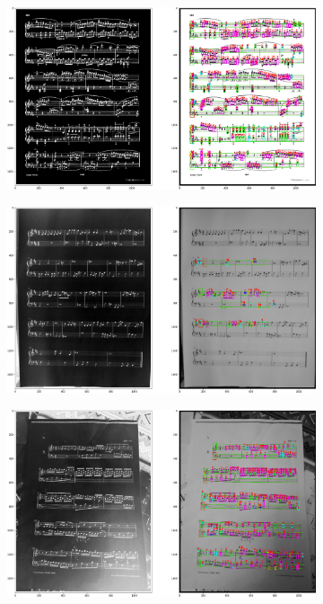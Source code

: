 \documentclass[12pt]{article}
\begin{document}
\begin{enumerate}
\begin{figure}[h!]
\begin{subfigure}[b]{0.48\linewidth}
				\end{subfigure}
				\begin{subfigure}[b]{0.48\linewidth}
					\includegraphics[width=\linewidth]{Medium/Zdj16.png}
				\end{subfigure}
				\begin{subfigure}[b]{0.48\linewidth}
					\includegraphics[width=\linewidth]{Medium/Zdj17.png}
				\end{subfigure}
				\begin{subfigure}[b]{0.48\linewidth}
					\includegraphics[width=\linewidth]{Medium/Zdj18.png}

\end{subfigure}
\end{figure}
\end{enumerate}
\end{document}
